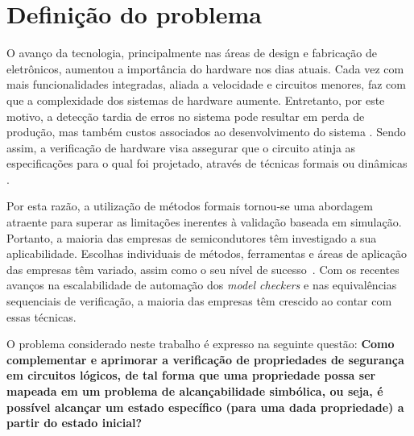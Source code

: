 \section{Definição do problema}

O avanço da tecnologia, principalmente nas áreas de design e fabricação de eletrônicos, aumentou a importância do hardware nos dias atuais. Cada vez com mais funcionalidades integradas, aliada a velocidade e circuitos menores, faz com que a complexidade dos sistemas de hardware aumente. Entretanto, por este motivo, a detecção tardia de erros no sistema pode resultar em perda de produção, mas também custos associados ao desenvolvimento do sistema \cite{gupta1992formal}. Sendo assim, a verificação de hardware visa assegurar que o circuito atinja as especificações para o qual foi projetado, através de técnicas formais ou dinâmicas \cite{boule2007efficient}.

\par
Por esta razão, a utilização de métodos formais tornou-se uma abordagem atraente para superar as limitações inerentes à validação baseada em simulação. Portanto, a maioria das empresas de semicondutores têm investigado a sua aplicabilidade. Escolhas individuais de métodos, ferramentas e áreas de aplicação das empresas têm variado, assim como o seu nível de sucesso~\cite{cabodi2016hardware}. Com os recentes avanços na escalabilidade de automação dos \textit{model checkers} e nas equivalências sequenciais de verificação, a maioria das empresas têm crescido ao contar com essas técnicas\cite{clarke2008birth}.

\par 
O problema considerado neste trabalho é expresso na seguinte questão: \textbf{Como complementar e aprimorar a verificação de propriedades de segurança em circuitos lógicos, de tal forma que uma propriedade possa ser mapeada em um problema de alcançabilidade simbólica, ou seja, é possível alcançar um estado específico (para uma dada propriedade) a partir do estado inicial?}

